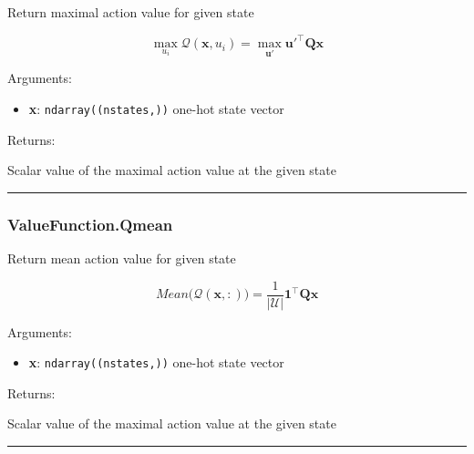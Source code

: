\begin{Shaded}
\begin{Highlighting}[]
\end{Highlighting}
\end{Shaded}

Return maximal action value for given state

\[
\max_{u_i}\mathcal Q(\mathbf x, u_i) = \max_{\mathbf u'} \mathbf u'^\top \mathbf Q \mathbf x
\]

Arguments:

\begin{itemize}
\tightlist
\item
  \textbf{x}: \texttt{ndarray((nstates,))} one-hot state vector
\end{itemize}

Returns:

Scalar value of the maximal action value at the given state

\begin{center}\rule{0.5\linewidth}{\linethickness}\end{center}

\subsubsection{ValueFunction.Qmean}\label{valuefunction.qmean}

\begin{Shaded}
\begin{Highlighting}[]
\end{Highlighting}
\end{Shaded}

Return mean action value for given state

\[
Mean \big(\mathcal Q(\mathbf x, :)\big) = \frac{1}{|\mathcal U|} \mathbf 1^\top \mathbf Q \mathbf x
\]

Arguments:

\begin{itemize}
\tightlist
\item
  \textbf{x}: \texttt{ndarray((nstates,))} one-hot state vector
\end{itemize}

Returns:

Scalar value of the maximal action value at the given state

\begin{center}\rule{0.5\linewidth}{\linethickness}\end{center}

